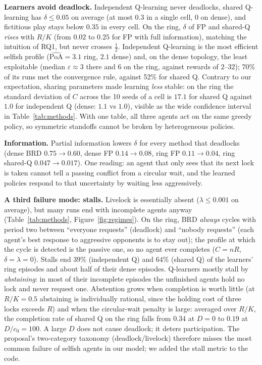 \documentclass[10pt]{article}
\newcommand{\PoAhat}{\widehat{\mathrm{PoA}}}
\begin{document}
\textbf{Learners avoid deadlock.} Independent Q-learning never deadlocks, shared Q-learning has $\delta\le0.05$ on
average (at most $0.3$ in a single cell, $0$ on dense), and fictitious play stays below $0.35$ in every cell. On the ring, $\delta$ of FP and shared-Q \emph{rises} with
$R/K$ (from $0.02$ to $0.25$ for FP with full information), matching the intuition of RQ1, but never crosses
$\tfrac12$. Independent Q-learning is the most efficient selfish profile ($\PoAhat=3.1$ ring, $2.1$ dense) and, on the dense
topology, the least exploitable (median $\varepsilon\approx3$ there and $6$ on the ring, against rewards of $2$--$32$); 70\% of its runs met the convergence rule,
against 52\% for shared Q. Contrary to our expectation, sharing parameters made learning \emph{less} stable: on the ring
the standard deviation of $C$ across the 10 seeds of a cell is $17.1$ for shared Q against $1.0$ for independent Q
(dense: $1.1$ vs $1.0$), visible as the wide confidence interval in Table~\ref{tab:methods}. With one table, all three
agents act on the same greedy policy, so symmetric standoffs cannot be broken by heterogeneous policies.

\textbf{Information.} Partial information lowers $\delta$ for every method that deadlocks (dense BRD $0.75\to0.60$,
dense FP $0.14\to0.08$, ring FP $0.11\to0.04$, ring shared-Q $0.047\to0.017$). One reading: an agent that only sees that its next lock is taken cannot tell a passing conflict from a circular wait,
and the learned policies respond to that uncertainty by waiting less aggressively.

\textbf{A third failure mode: stalls.} Livelock is essentially absent ($\lambda\le0.001$ on average), but many runs end
with incomplete agents anyway (Table~\ref{tab:methods}, Figure~\ref{fig:regimes}). On the ring, BRD \emph{always} cycles
with period two between ``everyone requests'' (deadlock) and ``nobody requests'' (each agent's best response to aggressive
opponents is to stay out); the profile at which the cycle is detected is the passive one, so no agent ever completes
($C=nR$, $\delta=\lambda=0$). Stalls end $39\%$ (independent Q) and $64\%$ (shared Q) of the
learners' ring episodes and about half of their dense episodes. Q-learners mostly stall by \emph{abstaining}: in most of their incomplete episodes the unfinished agents hold no lock and never
request one. Abstention grows when completion is worth little (at $R/K=0.5$ abstaining is individually rational, since
the holding cost of three locks exceeds $R$) and when the circular-wait penalty is large: averaged over $R/K$, the
completion rate of shared Q on the ring falls from $0.34$ at $D=0$ to $0.19$ at $D/c_0=100$. A large $D$ does not cause
deadlock; it deters participation. The proposal's two-category taxonomy
(deadlock/livelock) therefore misses the most common failure of selfish agents in our model; we added the stall metric
to the code.
\end{document}
